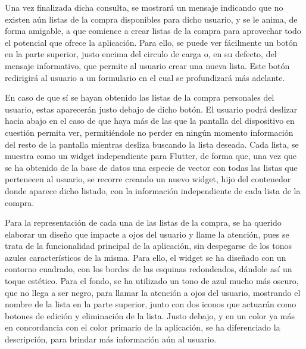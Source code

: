 \documentclass{article}
\begin{document}
Una vez finalizada dicha consulta, se mostrará un mensaje indicando que no existen aún listas de la compra disponibles para dicho usuario, y se le anima, de forma amigable, a que comience a crear listas de la compra para aprovechar todo el potencial que ofrece la aplicación. Para ello, se puede ver fácilmente un botón en la parte superior, justo encima del circulo de carga o, en su defecto, del mensaje informativo, que permite al usuario crear una nueva lista. Este botón redirigirá al usuario a un formulario en el cual se profundizará más adelante.

En caso de que sí se hayan obtenido las listas de la compra personales del usuario, estas aparecerán justo debajo de dicho botón. El usuario podrá deslizar hacia abajo en el caso de que haya más de las que la pantalla del dispositivo en cuestión permita ver, permitiéndole no perder en ningún momento información del resto de la pantalla mientras desliza buscando la lista deseada. Cada lista, se muestra como un widget independiente para Flutter, de forma que, una vez que se ha obtenido de la base de datos una especie de vector con todas las listas que pertenecen al usuario, se recorre creando un nuevo widget, hijo del contenedor donde aparece dicho listado, con la información independiente de cada lista de la compra.

Para la representación de cada una de las listas de la compra, se ha querido elaborar un diseño que impacte a ojos del usuario y llame la atención, pues se trata de la funcionalidad principal de la aplicación, sin despegarse de los tonos azules característicos de la misma. Para ello, el widget se ha diseñado con un contorno cuadrado, con los bordes de las esquinas redondeados, dándole así un toque estético. Para el fondo, se ha utilizado un tono de azul mucho más oscuro, que no llega a ser negro, para llamar la atención a ojos del usuario, mostrando el nombre de la lista en la parte superior, junto con dos iconos que actuarán como botones de edición y eliminación de la lista. Justo debajo, y en un color ya más en concordancia con el color primario de la aplicación, se ha diferenciado la descripción, para brindar más información aún al usuario.
\end{document}
